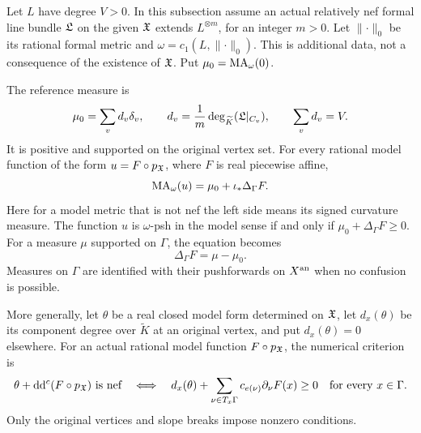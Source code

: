 Let \(L\) have degree \(V>0\).  In this subsection assume an actual
relatively nef formal line bundle \(\mathfrak L\) on the given \(\mathfrak X\)
extends \(L^{\otimes m}\), for an integer \(m>0\).
Let \(\lVert\cdot\rVert_0\) be its rational formal metric and
\(\omega=c_1(L,\lVert\cdot\rVert_0)\).
This is additional data, not a consequence of the existence of
\(\mathfrak X\).  Put \(\mu_0=\operatorname{MA}_\omega(0)\).

\begin{lemma}
\label{lem:ch31-curve-ma-affine}
The reference measure is
\[
 \mu_0=\sum_v d_v\delta_v,\qquad
 d_v=\frac1m\deg_{\widetilde K}(\mathfrak L|_{C_v}),\qquad
 \sum_vd_v=V.
\]
It is positive and supported on the original vertex set.
For every rational model function of the form
\(u=F\circ p_{\mathfrak X}\), where \(F\) is real piecewise affine,
\begin{equation}
\label{eq:curve-ma-laplacian}
                 \operatorname{MA}_\omega(u)=\mu_0+\iota_*\Delta_\Gamma F.
\end{equation}
Here for a model metric that is not nef the left side means its signed
curvature measure.  The function \(u\) is \(\omega\)-psh in the
model sense if and only if \(\mu_0+\Delta_\Gamma F\geq0\).
For a measure \(\mu\) supported on \(\Gamma\), the equation becomes
\begin{equation}
\label{eq:curve-poisson}
                      \Delta_\Gamma F=\mu-\mu_0 .
\end{equation}
Measures on \(\Gamma\) are identified with their pushforwards on
\(X^{\mathrm{an}}\) when no confusion is possible.

More generally, let \(\theta\) be a real closed model form determined
on \(\mathfrak X\), let \(d_x(\theta)\) be its component degree over
\(\widetilde K\) at an original vertex, and put \(d_x(\theta)=0\)
elsewhere.  For an actual rational model function
\(F\circ p_{\mathfrak X}\), the numerical criterion is
\begin{equation}
\label{eq:curve-slope-criterion}
 \theta+\mathrm d\mathrm d^c(F\circ p_{\mathfrak X})\text{ is nef}
 \quad\Longleftrightarrow\quad
 d_x(\theta)+\sum_{\nu\in T_x\Gamma}
       c_{e(\nu)}\partial_\nu F(x)\geq0
 \quad\text{for every }x\in\Gamma.
\end{equation}
Only the original vertices and slope breaks impose nonzero conditions.
\end{lemma}


